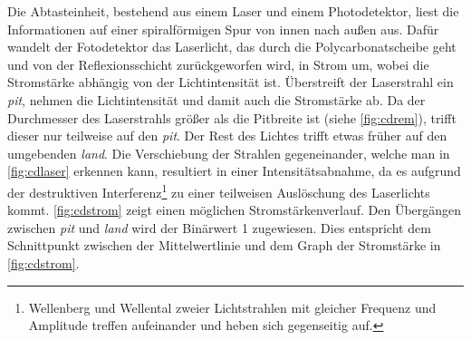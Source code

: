 Die Abtasteinheit, bestehend aus einem Laser und einem Photodetektor, liest die
Informationen auf einer spiralförmigen Spur von innen nach außen aus. Dafür
wandelt der Fotodetektor das Laserlicht, das durch die Polycarbonatscheibe geht
und von der Reflexionsschicht zurückgeworfen wird, in Strom um, wobei die
Stromstärke abhängig von der Lichtintensität ist. Überstreift der Laserstrahl
ein \textit{pit}, nehmen die Lichtintensität und damit auch die Stromstärke ab.
Da der Durchmesser des Laserstrahls größer als die Pitbreite ist (siehe
\autoref{fig:cdrem}), trifft dieser nur teilweise auf den \textit{pit}. Der Rest
des Lichtes trifft etwas früher auf den umgebenden \textit{land}. Die
Verschiebung der Strahlen gegeneinander, welche man in \autoref{fig:cdlaser}
erkennen kann, resultiert in einer Intensitätsabnahme, da es aufgrund der
destruktiven Interferenz\footnote{Wellenberg und Wellental zweier Lichtstrahlen
mit gleicher Frequenz und Amplitude treffen aufeinander und heben sich
gegenseitig auf.} zu einer teilweisen Auslöschung des Laserlichts kommt.
\autoref{fig:cdstrom} zeigt einen möglichen Stromstärkenverlauf. Den Übergängen
zwischen \textit{pit} und \textit{land} wird der Binärwert 1 zugewiesen. Dies
entspricht dem Schnittpunkt zwischen der Mittelwertlinie und dem Graph der
Stromstärke in \autoref{fig:cdstrom}. \cite{cdp}

